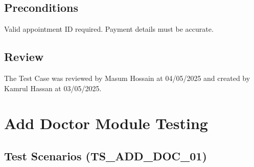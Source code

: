 \documentclass{article}
\begin{document}
\subsection{Preconditions}
Valid appointment ID required. Payment details must be accurate.

\subsection{Review}
The Test Case was reviewed by Masum Hossain at 04/05/2025 and created by Kamrul Hassan at 03/05/2025.

\section{Add Doctor Module Testing}

\subsection{Test Scenarios (TS\_ADD\_DOC\_01)}
\end{document}
